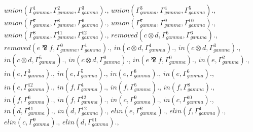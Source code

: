 \documentclass[a4paper, 11pt]{article}
\begin{document}
$union(\Gamma_{gamma}^{1}, \Gamma_{gamma}^{2}, \Gamma_{gamma}^{3}).$, $union(\Gamma_{gamma}^{3}, \Gamma_{gamma}^{4}, \Gamma_{gamma}^{5}).$, $union(\Gamma_{gamma}^{7}, \Gamma_{gamma}^{8}, \Gamma_{gamma}^{6}).$, $union(\Gamma_{gamma}^{7}, \Gamma_{gamma}^{9}, \Gamma_{gamma}^{10}).$, $union(\Gamma_{gamma}^{8}, \Gamma_{gamma}^{11}, \Gamma_{gamma}^{12}).$, $removed(c \otimes d, \Gamma_{gamma}^{5}, \Gamma_{gamma}^{6}).$, $removed(e \bindnasrepma f, \Gamma_{gamma}^{0}, \Gamma_{gamma}^{1}).$, $in(c \otimes d, \Gamma_{gamma}^{1}).$, $in(c \otimes d, \Gamma_{gamma}^{3}).$, $in(c \otimes d, \Gamma_{gamma}^{5}).$, $in(c \otimes d, \Gamma_{gamma}^{0}).$, $in(e \bindnasrepma f, \Gamma_{gamma}^{0}).$, $in(e, \Gamma_{gamma}^{2}).$, $in(e, \Gamma_{gamma}^{3}).$, $in(e, \Gamma_{gamma}^{5}).$, $in(e, \Gamma_{gamma}^{8}).$, $in(e, \Gamma_{gamma}^{6}).$, $in(e, \Gamma_{gamma}^{12}).$, $in(f, \Gamma_{gamma}^{4}).$, $in(f, \Gamma_{gamma}^{5}).$, $in(f, \Gamma_{gamma}^{8}).$, $in(f, \Gamma_{gamma}^{6}).$, $in(f, \Gamma_{gamma}^{12}).$, $in(c, \Gamma_{gamma}^{9}).$, $in(c, \Gamma_{gamma}^{10}).$, $in(d, \Gamma_{gamma}^{11}).$, $in(d, \Gamma_{gamma}^{12}).$, $elin(e, \Gamma_{gamma}^{2}).$, $elin(f, \Gamma_{gamma}^{4}).$, $elin(c, \Gamma_{gamma}^{9}).$, $elin(d, \Gamma_{gamma}^{11}).$, 
\end{document}
